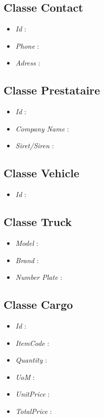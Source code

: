 \subsection{Classe Contact}
\begin{itemize}
	\item \textit{Id} :
	\item \textit{Phone} :
	\item \textit{Adress} :
\end{itemize}

\subsection{Classe Prestataire}
\begin{itemize}
	\item \textit{Id} :
	\item \textit{Company Name} :
	\item \textit{Siret/Siren} :
\end{itemize}

\subsection{Classe Vehicle}
\begin{itemize}
	\item \textit{Id} :
\end{itemize}

\subsection{Classe Truck}
\begin{itemize}
	\item \textit{Model} :
	\item \textit{Brand} :
	\item \textit{Number Plate} :
\end{itemize}

\subsection{Classe Cargo}
\begin{itemize}
	\item \textit{Id} :
	\item \textit{ItemCode} :
	\item \textit{Quantity} :
	\item \textit{UoM} :
	\item \textit{UnitPrice} :
	\item \textit{TotalPrice} :
\end{itemize}

